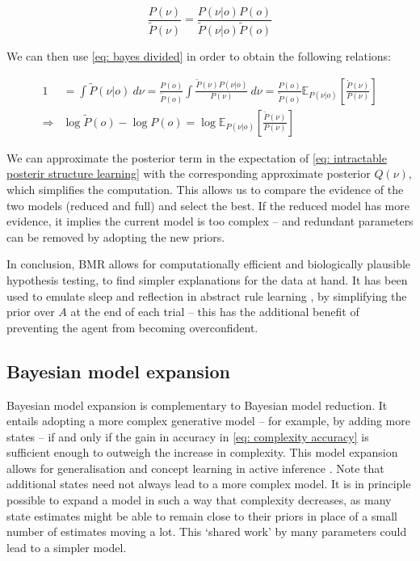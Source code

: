 \documentclass[review,12pt,authoryear]{elsarticle}
\newcommand{\E}{\mathbb E}
\begin{document}
	 \begin{equation}
\label{eq: bayes divided}
	     \frac{P(\nu)}{\tilde P(\nu)} = \frac{P(\nu|o)P(o)}{\tilde P(\nu|o)\tilde P(o)} 
	 \end{equation}
  	
 We can then use \eqref{eq: bayes divided} in order to obtain the following relations:
 
 \begin{align}
        1 &= \int \tilde P(\nu|o)\: d\nu =\frac{P(o)}{\tilde P(o)}\int \frac{\tilde P(\nu) P(\nu|o)}{P(\nu)} \:d\nu = \frac{P(o)}{\tilde P(o)}\E_{P(\nu|o)}\left[\frac{\tilde P(\nu)}{P(\nu)}\right] \\
        \Rightarrow &\log \tilde P(o) -\log  P(o) =\log \E_{P(\nu|o)}\left[\frac{\tilde P(\nu)}{P(\nu)}\right] \label{eq: intractable posterir structure learning}
 \end{align}

We can approximate the posterior term in the expectation of \eqref{eq: intractable posterir structure learning} with the corresponding approximate posterior $Q(\nu)$, which simplifies the computation. This allows us to compare the evidence of the two models (reduced and full) and select the best. If the reduced model has more evidence, it implies the current model is too complex – and redundant parameters can be removed by adopting the new priors.

In conclusion, BMR allows for computationally efficient and biologically plausible hypothesis testing, to find simpler explanations for the data at hand. It has been used to emulate sleep and reflection in abstract rule learning \citep{fristonActiveInferenceCuriosity2017}, by simplifying the prior over $A$ at the end of each trial -- this has the additional benefit of preventing the agent from becoming overconfident.

\subsection{Bayesian model expansion}

Bayesian model expansion is complementary to Bayesian model reduction. It entails adopting a more complex generative model -- for example, by adding more states -- if and only if the gain in accuracy in \eqref{eq: complexity accuracy} is sufficient enough to outweigh the increase in complexity. This model expansion allows for generalisation and concept learning in active inference \citep{smithActiveInferenceModel2019}. Note that additional states need not always lead to a more complex model. It is in principle possible to expand a model in such a way that complexity decreases, as many state estimates might be able to remain close to their priors in place of a small number of estimates moving a lot. This ‘shared work’ by many parameters could lead to a simpler model.
\end{document}
